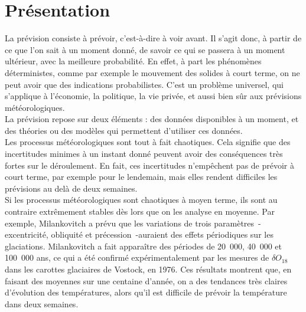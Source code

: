 \documentclass[11pt,a4paper]{article}
\begin{document}
\section{Présentation} 
La prévision consiste à prévoir, c'est-à-dire à \og voir avant\fg{}. Il s'agit donc, à partir de ce que l'on sait à un moment donné, de savoir ce qui se passera à un moment ultérieur, avec la meilleure probabilité. En effet, à part les phénomènes déterministes, comme par exemple le mouvement des solides à court terme, on ne peut avoir que des indications probabilistes. C'est un problème universel, qui s'applique à l'économie, la politique, la vie privée, et aussi bien sûr aux prévisions météorologiques.\\   
La prévision repose sur deux éléments : des données disponibles à un moment, et des théories ou des modèles qui permettent d'utiliser ces données. \\
Les processus météorologiques sont tout à fait chaotiques. Cela signifie que des incertitudes minimes à un instant donné peuvent avoir des conséquences très fortes sur le déroulement. En fait, ces incertitudes n'empêchent pas de prévoir à court terme, par exemple pour le lendemain, mais elles rendent difficiles les prévisions au delà de deux semaines. \\
Si les processus météorologiques sont chaotiques à moyen terme, ils sont au contraire extrêmement stables dès lors que on les analyse en moyenne. Par exemple, Milankovitch a prévu que les variations de trois paramètres~-excentricité, obliquité et précession~-auraient des effets périodiques sur les glaciations. Milankovitch a fait apparaître des périodes de 20~000, 40~000 et 100~000 ans, ce qui a été confirmé expérimentalement par les mesures de $\delta O_{18}$ dans les carottes glaciaires de Vostock, en 1976. Ces résultats montrent que, en faisant des moyennes sur une centaine d'année, on a des tendances très claires d'évolution des températures, alors qu'il est difficile de prévoir la température dans deux semaines.   
 
\end{document}
